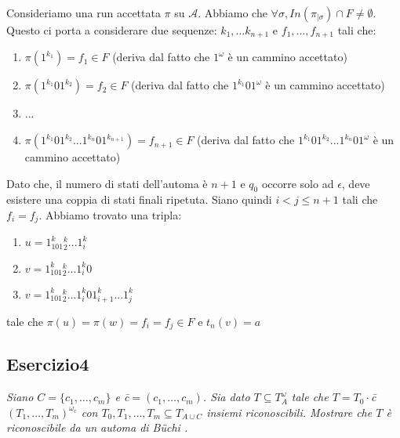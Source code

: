 \documentclass[12pt]{article}
\newcommand{\A}{\ensuremath{\mathcal{A}}\xspace}
\newcommand{\buchi}{B\"uchi }
\begin{document}
Consideriamo una run accettata $\pi$ su $\A$. Abbiamo che $\forall \sigma, In(\pi_{|\sigma}) \cap F \neq \emptyset$. Questo ci porta a considerare due sequenze: $k_1,...k_{n+1}$ e $f_1,...,f_{n+1}$ tali che:
\begin{enumerate}
\item $\pi(1^{k_1}) = f_1 \in F$ (deriva dal fatto che $1^\omega$ è un cammino accettato)
\item $\pi(1^{k_1}01^{k_2}) = f_2 \in F$ (deriva dal fatto che $1^{k_1}01^\omega$ è un cammino accettato)
\item ...
\item $\pi(1^{k_1}01^{k_2}...1^{k_n}01^{k_{n+1}}) = f_{n+1} \in F$ (deriva dal fatto che $1^{k_1}01^{k_2}...1^{k_n}01^\omega$ è un cammino accettato)
\end{enumerate}

Dato che, il numero di stati dell'automa è $n+1$ e $q_0$ occorre solo ad $\epsilon$, deve esistere una coppia di stati finali ripetuta. Siano quindi $i<j\leq n+1$ tali che $f_i=f_j$. Abbiamo trovato una tripla:
\begin{enumerate}
\item $u=1^k_101^k_2...1^k_i$
\item $v=1^k_101^k_2...1^k_i0$
\item $v=1^k_101^k_2...1^k_i01^k_{i+1}...1^k_j$
\end{enumerate} 
tale che $\pi(u)=\pi(w)=f_i=f_j \in F$ e $t_n(v)=a$ 

\subsection*{Esercizio4}
\textit{Siano $C=\{c_1,\ldots,c_m\}$ e \=c$= ( c_1,\ldots,c_m) $. Sia dato $T \subseteq T^{\omega}_A$ tale che $T=T_0 \cdot$\=c$(T_1,\ldots,T_m)^{\omega_{\textrm{\=c}}}$ con $T_0,T_1,\ldots,T_m \subseteq T_{A \cup C}$ insiemi riconoscibili. Mostrare che $T$ è riconoscibile da un automa di \buchi.}
\end{document}
